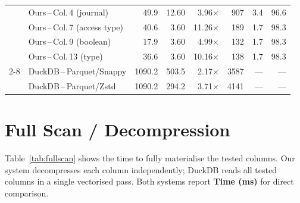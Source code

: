 \documentclass[a4paper,11pt]{article}
\begin{document}
\begin{table}[h]
{\begin{tabular}{llrrrrrr}
  & Ours\,--\,Col.\,4  (journal)     &  49.9 &  12.60 &  3.96$\times$ &   907 &   3.4 &  96.6 \\
  & Ours\,--\,Col.\,7  (access type) &  40.6 &   3.60 & 11.26$\times$ &   189 &   1.7 &  98.3 \\
  & Ours\,--\,Col.\,9  (boolean)     &  17.9 &   3.60 &  4.99$\times$ &   132 &   1.7 &  98.3 \\
  & Ours\,--\,Col.\,13 (type)        &  36.6 &   3.60 & 10.16$\times$ &   138 &   1.7 &  98.3 \\
\cmidrule{2-8}
  & DuckDB\,--\,Parquet/Snappy       & 1090.2 & 503.5 &  2.17$\times$ &  3587 & --- & --- \\
  & DuckDB\,--\,Parquet/Zstd         & 1090.2 & 294.2 &  3.71$\times$ &  4141 & --- & --- \\
\bottomrule
\end{tabular}}
\end{table}

\newpage
\section{Full Scan / Decompression}

Table~\ref{tab:fullscan} shows the time to fully materialise the tested
columns. Our system decompresses each column independently; DuckDB
reads all tested columns in a single vectorised pass. Both systems
report \textbf{Time (ms)} for direct comparison.
\end{document}
